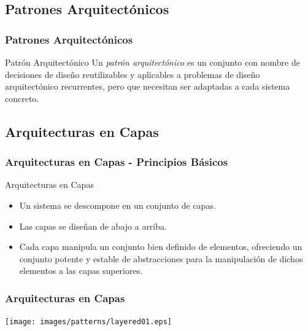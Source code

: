 \documentclass[handout,a4paper,t,xcolor=pst,dvips,colortheme]{beamer}
\begin{document}
\subsection{Patrones Arquitectónicos}

\begin{frame}[c]
	\frametitle{Patrones Arquitectónicos}
    \begin{block}{Patrón Arquitectónico}
        Un \emph{patrón arquitectónico} es un conjunto con nombre de decisiones de diseño reutilizables y aplicables a problemas de diseño arquitectónico recurrentes, pero que necesitan ser adaptadas a cada sistema concreto.
	\end{block}
\end{frame}

\subsection{Arquitecturas en Capas}

\begin{frame}[c]
    \frametitle{Arquitecturas en Capas - Principios Básicos}
    \begin{block}{Arquitecturas en Capas}
        \begin{itemize}[<+->]
            \item Un sistema se descompone en un conjunto de capas.
            \item Las capas se diseñan de abajo a arriba.
            \item Cada capa manipula un conjunto bien definido de elementos, ofreciendo un \alert{conjunto potente y estable de abstracciones} para la manipulación de dichos elementos a las capas superiores.
        \end{itemize}
    \end{block}
\end{frame}


\begin{frame}[c]
	\frametitle{Arquitecturas en Capas}
	\begin{center}
        \texttt{[image: images/patterns/layered01.eps]}
	\end{center}
\end{frame}
\end{document}
